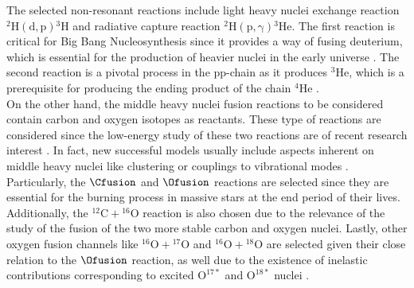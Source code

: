 \documentclass[openany]{book}
\begin{document}
The selected non-resonant reactions include light heavy nuclei exchange reaction $\mathrm{{}^{2}{H}(d,p){}^{3}{H}} $ and radiative capture reaction  $\mathrm{{}^{2}{H} (p, \gamma) {}^{3}{He}} $. The first reaction is critical for Big Bang Nucleosynthesis since it provides a way of fusing deuterium, which is essential for the production of heavier nuclei in the early universe \cite{coc_vangioni_2010}. The second reaction is a pivotal process in the pp-chain as it produces $\mathrm{{}^{3}He}$, which is a prerequisite  for producing the ending product of the chain $\mathrm{{}^{4}He}$ \cite{fowler_1958}. \\

 On the other hand, the middle heavy nuclei fusion reactions to be considered contain carbon and oxygen isotopes as reactants. These type of reactions are considered since the low-energy study of these two reactions are of recent research interest \cite{mukhamedzhanov_pang_kadyrov_2019, taniguchi_kimura_2021, torilov_maltsev_zherebchevsky_2021}. In fact, new successful models usually include aspects inherent on middle heavy nuclei like clustering \cite{assuncao_descouvemont_2016} or couplings to vibrational modes \cite{duarte_gasques_oliveira_zagatto_chamon_medina_added_seale_alcantara-nunez_rossi_et_2015}. \\
 
 Particularly, the $\Cfusion$  and $\Ofusion$ reactions are selected since they are essential for the burning process in massive stars at the end period of their lives. Additionally, the $\mathrm{{}^{12}C + {}^{16}O}$ reaction is also chosen due to the relevance of the study of the fusion of the two more stable carbon and oxygen nuclei. Lastly, other oxygen fusion channels like $\mathrm{{}^{16}O + {}^{17}O}$ and $\mathrm{{}^{16}O + {}^{18}O}$ are selected given their close relation to the $\Ofusion$ reaction, as well due to the existence of inelastic contributions corresponding to excited $\mathrm{O^{17*}}$ and $\mathrm{O^{18*}}$ nuclei \cite{thomas_chen_hinds_meredith_olson_1986}.   \\




\end{document}
